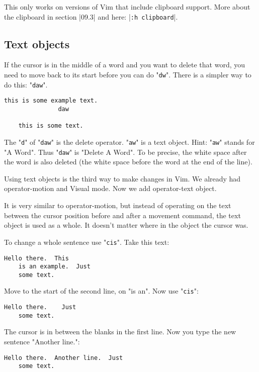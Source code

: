 This only works on versions of Vim that include clipboard support.
More about the clipboard in section |09.3| and here: |\verb!:h clipboard!|.

\subsection{Text objects}

If the cursor is in the middle of a word and you want to delete that word, you need to move back to its start before you can do "\verb!dw!".
There is a simpler way to do this: "\verb!daw!".

\begin{Verbatim}[samepage=true]
    this is some example text. 
               daw

    this is some text. 
\end{Verbatim}

The "\verb!d!" of "\verb!daw!" is the delete operator.
"\verb!aw!" is a text object.
Hint: "\verb!aw!" stands for "A Word".
Thus "\verb!daw!" is "Delete A Word".
To be precise, the white space after the word is also deleted (the white space before the word at the end of the line).

Using text objects is the third way to make changes in Vim.
We already had operator-motion and Visual mode.
Now we add operator-text object.

It is very similar to operator-motion, but instead of operating on the text between the cursor position before and after a movement command, the text object is used as a whole.
It doesn't matter where in the object the cursor was.

To change a whole sentence use "\verb!cis!".
Take this text:

\begin{Verbatim}[samepage=true]
    Hello there.  This 
    is an example.  Just 
    some text. 
\end{Verbatim}

Move to the start of the second line, on "is an".
Now use "\verb!cis!":

\begin{Verbatim}[samepage=true]
    Hello there.    Just 
    some text. 
\end{Verbatim}

The cursor is in between the blanks in the first line.
Now you type the new sentence "Another line.":

\begin{Verbatim}[samepage=true]
    Hello there.  Another line.  Just 
    some text. 
\end{Verbatim}

